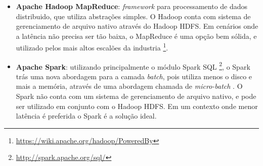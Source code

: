 \begin{itemize}
    \item \textbf{Apache Hadoop MapReduce}: \textit{framework} para processamento
de dados distribuido, que utiliza abstrações simples. O Hadoop conta com sistema
de gerenciamento de arquivo nativo através do Hadoop HDFS. Em cenários onde a
latência não precisa ser tão baixa, o MapReduce é uma opção bem sólida, e
utilizado pelos mais altos escalões da
industria \footnote{\url{https://wiki.apache.org/hadoop/PoweredBy}}.

    \item \textbf{Apache Spark}: utilizando principalmente o módulo Spark SQL
\footnote{\url{http://spark.apache.org/sql/}}, o Spark trás uma nova abordagem
para a camada \textit{batch}, pois utiliza menos o disco e mais a memória,
através de uma abordagem chamada de \textit{micro-batch} \cite{arsalan2014}.
O Spark não conta com um sistema de gerenciamento de arquivo nativo, e pode
ser utilizado em conjunto com o Hadoop HDFS. Em um contexto onde menor latência
é preferida o Spark é a solução ideal.

\end{itemize}

